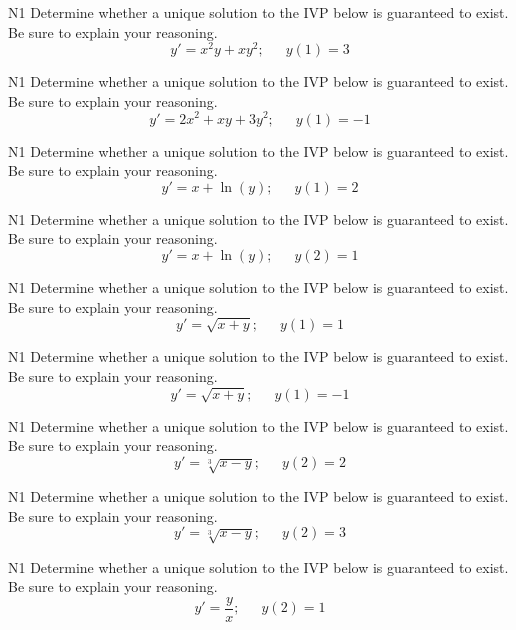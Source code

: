 \begin{problem}{N1}
Determine whether a unique solution to the IVP below is guaranteed to exist.
Be sure to explain your reasoning.
\[
y' = x^2y + xy^2; \,\,\,\,\,\,\,\,\,y(1) = 3
\]
\end{problem}

\begin{problem}{N1}
Determine whether a unique solution to the IVP below is guaranteed to exist.
Be sure to explain your reasoning.
\[
y' = 2x^2 + xy + 3y^2;\,\,\,\,\,\,\,\,\,y(1) = -1
\]
\end{problem}

\begin{problem}{N1}
Determine whether a unique solution to the IVP below is guaranteed to exist.
Be sure to explain your reasoning.
\[
y' = x + \ln(y);\,\,\,\,\,\,\,\,\,y(1) = 2
\]
\end{problem}

\begin{problem}{N1}
Determine whether a unique solution to the IVP below is guaranteed to exist.
Be sure to explain your reasoning.
\[
y' = x + \ln(y);\,\,\,\,\,\,\,\,\,y(2) = 1
\]
\end{problem}

\begin{problem}{N1}
Determine whether a unique solution to the IVP below is guaranteed to exist.
Be sure to explain your reasoning.
\[
y' = \sqrt{x+y};\,\,\,\,\,\,\,\,\,y(1) = 1
\]
\end{problem}

\begin{problem}{N1}
Determine whether a unique solution to the IVP below is guaranteed to exist.
Be sure to explain your reasoning.
\[
y' = \sqrt{x+y};\,\,\,\,\,\,\,\,\,y(1) = -1
\]
\end{problem}

\begin{problem}{N1}
Determine whether a unique solution to the IVP below is guaranteed to exist.
Be sure to explain your reasoning.
\[
y' = \sqrt[3]{x-y};\,\,\,\,\,\,\,\,\,y(2) = 2
\]
\end{problem}

\begin{problem}{N1}
Determine whether a unique solution to the IVP below is guaranteed to exist.
Be sure to explain your reasoning.
\[
y' = \sqrt[3]{x-y};\,\,\,\,\,\,\,\,\,y(2) = 3
\]
\end{problem}

\begin{problem}{N1}
Determine whether a unique solution to the IVP below is guaranteed to exist.
Be sure to explain your reasoning.
\[
y' = \frac{y}{x};\,\,\,\,\,\,\,\,\,y(2) = 1
\]
\end{problem}

